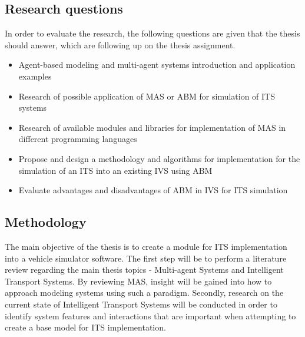 \documentclass[titlepage, 12pt]{article}
\begin{document}
 \subsection{Research questions}

In order to evaluate the research, the following questions are given that the thesis should answer, which are following up on the thesis assignment. 

\begin{itemize}
    \item Agent-based modeling and multi-agent systems introduction and application examples
    \item Research of possible application of MAS or ABM for simulation of ITS systems
    \item Research of available modules and libraries for implementation of MAS in different programming languages
    \item Propose and design a methodology and algorithms for implementation for the simulation of an ITS into an existing IVS using ABM
    \item Evaluate advantages and disadvantages of ABM in IVS for ITS simulation
\end{itemize}


\subsection{Methodology}

The main objective of the thesis is to create a module for ITS implementation into a vehicle simulator software. 
The first step will be to perform a literature review regarding the main thesis topics - Multi-agent Systems and 
Intelligent Transport Systems. By reviewing MAS, insight will be gained into how to approach modeling systems using 
such a paradigm. Secondly, research on the current state of Intelligent Transport Systems will be conducted in 
order to identify system features and interactions that are important when attempting to create a 
base model for ITS implementation. 
\end{document}
